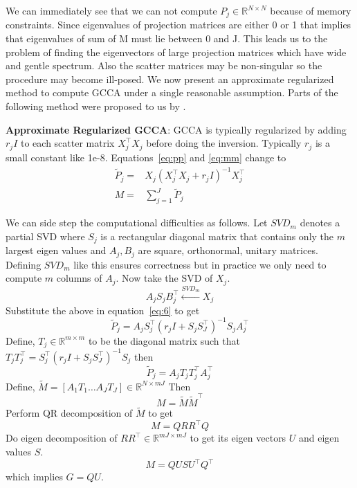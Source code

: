 \documentclass[11pt]{article}
\begin{document}
We can immediately see that we can not compute
 $P_j \in \mathbb{R}^{N \times N}$ because of memory constraints. Since eigenvalues of
projection matrices are either 0 or 1 that implies 
that eigenvalues of sum of M must lie between 0 and J.
This leads us to the problem of finding the eigenvectors of large 
projection matrices which have wide and gentle spectrum. Also the
scatter matrices may be non-singular so the procedure may become
ill-posed. We now present an approximate regularized method
to compute GCCA under a single reasonable assumption. Parts of the
following method were proposed to us by \cite{savostyanov}.

\textbf{Approximate Regularized GCCA}: GCCA is typically regularized by adding $r_jI$ to each
scatter matrix $X_j^\top X_j$ before doing the inversion. Typically
$r_j$ is a small constant like 1e-8. Equations~\ref{eq:pp}
and \ref{eq:mm} change to
\begin{align}
  \widetilde{P}_{j} =& X_j(X_j^\top X_j+r_jI)^{-1}X_j^\top \label{eq:6}\\
  M =& \sum_{j=1}^J \widetilde{P}_{j} \label{eq:mmm}
\end{align}

We can side step the computational difficulties as follows.
Let $SVD_m$ denotes a partial SVD where $S_j$ is a rectangular diagonal
matrix that contains only the $m$ largest eigen values and $A_j, B_j$
are square, orthonormal, unitary matrices. Defining $SVD_m$ like this
ensures correctness but in practice we only need to compute $m$
columns of $A_j$. Now take the SVD of $X_j$.
$$A_{j} S_{j} B^\top_{j} \xleftarrow{SVD_{m}} X_j$$
 Substitute the above in equation~\ref{eq:6} to get 
$$\widetilde{P}_j = A_j S_j^\top(r_j I + S_j S_J^\top)^{-1}S_j A_j^\top$$ 
Define, $T_j \in \mathbb{R}^{m \times m}$ to be the diagonal matrix such that
$T_jT_j^\top = S_j^\top(r_j I + S_j S_J^\top)^{-1}S_j $ then
$$\widetilde{P}_j = A_j T_j T_j^\top A_j^\top$$
Define, $\tilde{M} = \left[ A_1T_1 \ldots A_JT_J \right] \in \mathbb{R}^{N
  \times mJ}$
Then 
$$M = \tilde{M} \tilde{M}^\top$$
Perform QR decomposition of $\tilde{M}$ to get
$$M = Q R R^\top Q$$
Do eigen decomposition of $R R^\top \in \mathbb{R}^{mJ \times mJ}$
to get its eigen vectors $U$ and eigen values $S$.
$$M = Q U S U^\top Q^\top$$
 which implies $G = QU$. 
\end{document}
